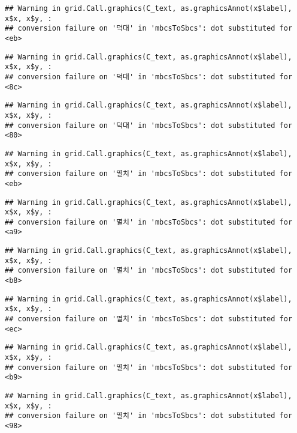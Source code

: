 \documentclass[
]{article}
\begin{document}
\begin{verbatim}
## Warning in grid.Call.graphics(C_text, as.graphicsAnnot(x$label), x$x, x$y, :
## conversion failure on '덕대' in 'mbcsToSbcs': dot substituted for <eb>
\end{verbatim}

\begin{verbatim}
## Warning in grid.Call.graphics(C_text, as.graphicsAnnot(x$label), x$x, x$y, :
## conversion failure on '덕대' in 'mbcsToSbcs': dot substituted for <8c>
\end{verbatim}

\begin{verbatim}
## Warning in grid.Call.graphics(C_text, as.graphicsAnnot(x$label), x$x, x$y, :
## conversion failure on '덕대' in 'mbcsToSbcs': dot substituted for <80>
\end{verbatim}

\begin{verbatim}
## Warning in grid.Call.graphics(C_text, as.graphicsAnnot(x$label), x$x, x$y, :
## conversion failure on '멸치' in 'mbcsToSbcs': dot substituted for <eb>
\end{verbatim}

\begin{verbatim}
## Warning in grid.Call.graphics(C_text, as.graphicsAnnot(x$label), x$x, x$y, :
## conversion failure on '멸치' in 'mbcsToSbcs': dot substituted for <a9>
\end{verbatim}

\begin{verbatim}
## Warning in grid.Call.graphics(C_text, as.graphicsAnnot(x$label), x$x, x$y, :
## conversion failure on '멸치' in 'mbcsToSbcs': dot substituted for <b8>
\end{verbatim}

\begin{verbatim}
## Warning in grid.Call.graphics(C_text, as.graphicsAnnot(x$label), x$x, x$y, :
## conversion failure on '멸치' in 'mbcsToSbcs': dot substituted for <ec>
\end{verbatim}

\begin{verbatim}
## Warning in grid.Call.graphics(C_text, as.graphicsAnnot(x$label), x$x, x$y, :
## conversion failure on '멸치' in 'mbcsToSbcs': dot substituted for <b9>
\end{verbatim}

\begin{verbatim}
## Warning in grid.Call.graphics(C_text, as.graphicsAnnot(x$label), x$x, x$y, :
## conversion failure on '멸치' in 'mbcsToSbcs': dot substituted for <98>
\end{verbatim}
\end{document}
